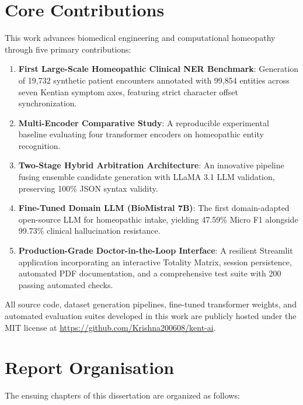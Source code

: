 
\section{Core Contributions}

This work advances biomedical engineering and computational homeopathy through five primary contributions:

\begin{enumerate}
  \item \textbf{First Large-Scale Homeopathic Clinical NER Benchmark}: Generation of 19,732 synthetic patient encounters annotated with 99,854 entities across seven Kentian symptom axes, featuring strict character offset synchronization.
  \item \textbf{Multi-Encoder Comparative Study}: A reproducible experimental baseline evaluating four transformer encoders on homeopathic entity recognition.
  \item \textbf{Two-Stage Hybrid Arbitration Architecture}: An innovative pipeline fusing ensemble candidate generation with LLaMA 3.1 LLM validation, preserving 100\% JSON syntax validity.
  \item \textbf{Fine-Tuned Domain LLM (BioMistral 7B)}: The first domain-adapted open-source LLM for homeopathic intake, yielding 47.59\% Micro F1 alongside 99.73\% clinical hallucination resistance.
  \item \textbf{Production-Grade Doctor-in-the-Loop Interface}: A resilient Streamlit application incorporating an interactive Totality Matrix, session persistence, automated PDF documentation, and a comprehensive test suite with 200 passing automated checks.
\end{enumerate}

\noindent All source code, dataset generation pipelines, fine-tuned transformer weights, and automated evaluation suites developed in this work are publicly hosted under the MIT license at \url{https://github.com/Krishna200608/kent-ai}.


\section{Report Organisation}

The ensuing chapters of this dissertation are organized as follows:


